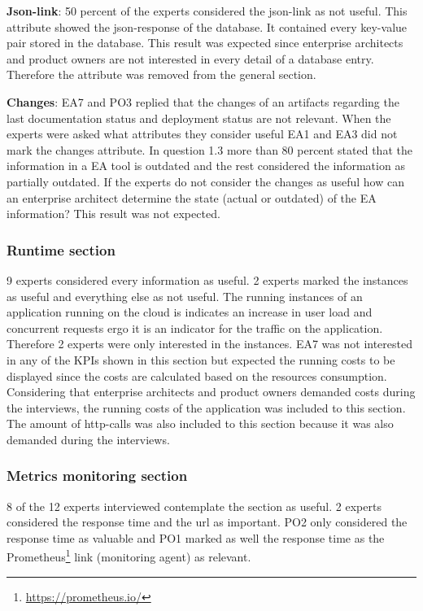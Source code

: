 \textbf{Json-link}: 50 percent of the experts considered the json-link as not useful. 
This attribute showed the json-response of the database. It contained every key-value pair stored in the database. This result was expected since enterprise architects and product owners are not interested in every detail of a database entry. Therefore the attribute was removed from the general section.

\textbf{Changes}: EA7 and PO3 replied that the changes of an artifacts regarding the last documentation status and deployment status are not relevant. When the experts were asked what attributes they consider useful EA1 and EA3 did not mark the changes attribute. In question 1.3 more than 80 percent stated that the information in a EA tool is outdated and the rest considered the information as partially outdated. If the experts do not consider the changes as useful how can an enterprise architect determine the state (actual or outdated) of the EA information? This result was not expected.

\subsubsection{Runtime section}

9 experts considered every information as useful. 2 experts marked the instances as useful and everything else as not useful. The running instances of an application running on the cloud is indicates an increase in user load and concurrent requests ergo it is an indicator for the traffic on the application. Therefore 2 experts were only interested in the instances. EA7 was not interested in any of the KPIs shown in this section but expected the running costs to be displayed since the costs are calculated based on the resources consumption. Considering that enterprise architects and product owners demanded costs during the interviews, the running costs of the application was included to this section. The amount of http-calls was also included to this section because it was also demanded during the interviews.

\subsubsection{Metrics monitoring section}

8 of the 12 experts interviewed contemplate the section as useful. 2 experts considered the response time and the url as important. PO2 only considered the response time as valuable and PO1 marked as well the response time as the Prometheus\footnote{\url{https://prometheus.io/}} link (monitoring agent) as relevant.

